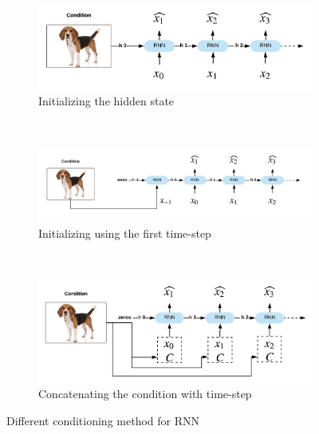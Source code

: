 \begin{figure}
    \centering
    \begin{subfigure}[b]{\textwidth}
      \includegraphics[width=\textwidth]{images/gbem/conditioning_model/hidden_state.jpeg}
      \caption{Initializing the hidden state}
      \label{subfig:hidden_state}
    \end{subfigure}
    ~
    \begin{subfigure}[b]{\textwidth}
        \includegraphics[width=\textwidth]{images/gbem/conditioning_model/first_timestep.jpeg}
        \caption{Initializing using the first time-step}
        \label{subfig:first_timestep}
    \end{subfigure}
    ~
    \begin{subfigure}[b]{\textwidth}
        \includegraphics[width=\textwidth]{images/gbem/conditioning_model/cat_timestep.jpeg}
        \caption{Concatenating the condition with time-step}
        \label{subfig:cat_timestep}
    \end{subfigure}
    \caption{Different conditioning method for RNN}
    \label{fig:conditioning_model}
\end{figure}

